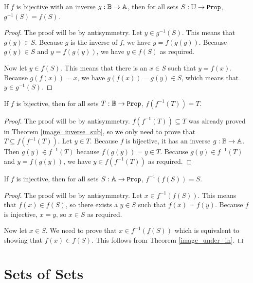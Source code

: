 \documentclass[../math.tex]{subfiles}
\begin{document}
\begin{theorem} \label{inverse_image_bij_inv}
    If $f$ is bijective with an inverse $g : \mathbb{B} \rightarrow \mathbb{A}$, then for all
    sets $S : \U \rightarrow \Prop$, $g^{-1}(S) = f(S)$.
\end{theorem}
\begin{proof}
    The proof will be by antisymmetry.  Let $y \in g^{-1}(S)$.  This means that
    $g(y) \in S$.  Because $g$ is the inverse of $f$, we have $y = f(g(y))$.
    Because $g(y) \in S$ and $y = f(g(y))$, we have $y \in f(S)$ as required.

    Now let $y \in f(S)$.  This means that there is an $x \in S$ such that $y =
    f(x)$.  Because $g(f(x)) = x$, we have $g(f(x)) = g(y) \in S$, which means
    that $y \in g^{-1}(S)$.
\end{proof}

\begin{theorem} \label{bij_inverse_image}
    If $f$ is bijective, then for all sets $T : \B \rightarrow \Prop$,
    $f(f^{-1}(T)) = T$.
\end{theorem}
\begin{proof}
    The proof will be by antisymmetry.  $f(f^{-1}(T)) \subseteq T$ was already
    proved in Theorem \ref{image_inverse_sub}, so we only need to prove that
    $T \subseteq f(f^{-1}(T))$.  Let $y \in T$.  Because $f$ is bijective, it
    has an inverse $g : \mathbb{B} \rightarrow \mathbb{A}$.  Then $g(y) \in f^{-1}(T)$ because
    $f(g(y)) = y \in T$.  Because $g(y) \in f^{-1}(T)$ and $y = f(g(y))$, we
    have $y \in f(f^{-1}(T))$ as required.
\end{proof}

\begin{theorem} \label{inj_inverse_image}
    If $f$ is injective, then for all sets $S : \A \rightarrow \Prop$,
    $f^{-1}(f(S)) = S$.
\end{theorem}
\begin{proof}
    The proof will be by antisymmetry.  Let $x \in f^{-1}(f(S))$.  This means
    that $f(x) \in f(S)$, so there exists a $y \in S$ such that $f(x) = f(y)$.
    Because $f$ is injective, $x = y$, so $x \in S$ as required.

    Now let $x \in S$.  We need to prove that $x \in f^{-1}(f(S))$ which is
    equivalent to showing that $f(x) \in f(S)$.  This follows from Theorem
    \ref{image_under_in}.
\end{proof}

\section{Sets of Sets}
\end{document}
